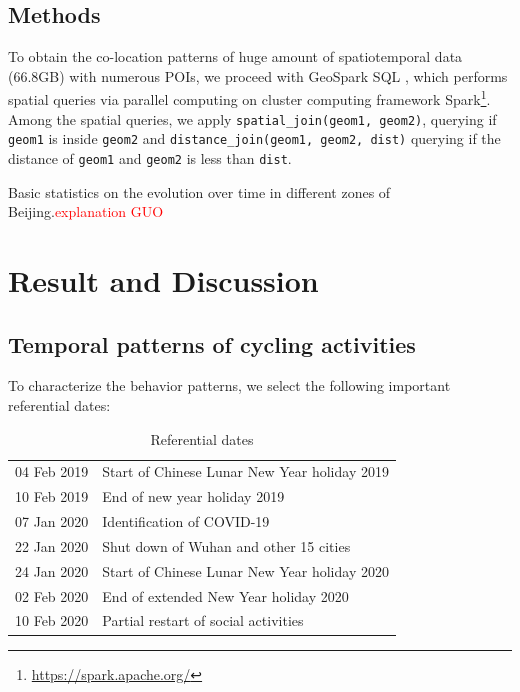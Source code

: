 \documentclass[preprints,ijgi,submit,moreauthors]{Definitions/mdpi}
\begin{document}
\subsection{Methods}
To obtain the co-location patterns of huge amount of spatiotemporal data (66.8GB) with numerous POIs, we proceed with GeoSpark SQL \cite{huang2017geospark}, which performs spatial queries via parallel computing on cluster computing framework Spark\footnote{\url{https://spark.apache.org/}}.
Among the spatial queries, we apply \texttt{spatial\_join(geom1, geom2)}, querying if \texttt{geom1} is inside \texttt{geom2} and \texttt{distance\_join(geom1, geom2, dist)} querying if the distance of \texttt{geom1} and \texttt{geom2} is less than \texttt{dist}.

Basic statistics on the evolution over time in different zones of Beijing.\textcolor{red}{explanation GUO} 

\section{Result and Discussion}
\subsection{Temporal patterns of cycling activities}
To characterize the behavior patterns, we select the following important referential dates: 

\begin{table}[H]
    \centering
    \begin{tabular}{ll}
    04 Feb 2019 & Start of Chinese Lunar New Year holiday 2019 \\
    10 Feb 2019 & End of new year holiday 2019\\
    07 Jan 2020 & Identification of COVID-19\\
    22 Jan 2020 & Shut down of Wuhan and other 15 cities\\
    24 Jan 2020 & Start of Chinese Lunar New Year holiday 2020\\
    02 Feb 2020 & End of extended New Year holiday 2020\\
    10 Feb 2020 & Partial restart of social activities
    \end{tabular}
    \caption{Referential dates}
    \label{tab:my_label}
\end{table}


\end{document}
